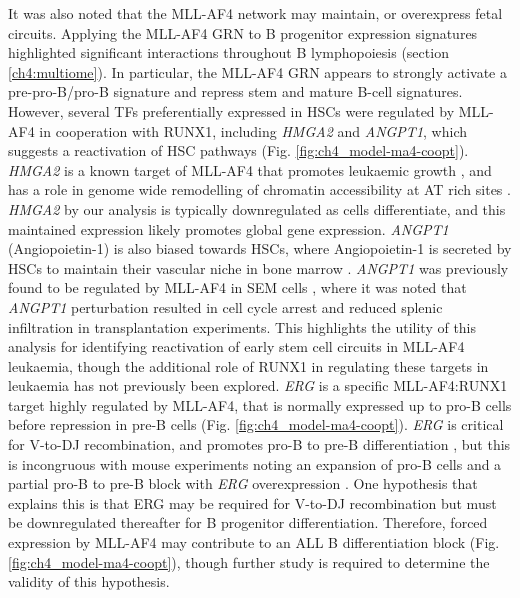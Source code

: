 It was also noted that the MLL-AF4 network may maintain, or overexpress fetal circuits. Applying the MLL-AF4 GRN to B progenitor expression signatures highlighted significant interactions throughout B lymphopoiesis (section \ref{ch4:multiome}). In particular, the MLL-AF4 GRN appears to strongly activate a pre-pro-B/pro-B signature and repress stem and mature B-cell signatures. However, several TFs preferentially expressed in HSCs were regulated by MLL-AF4 in cooperation with RUNX1, including \textit{HMGA2} and \textit{ANGPT1}, which suggests a reactivation of HSC pathways (Fig. \ref{fig:ch4_model-ma4-coopt}). \textit{HMGA2} is a known target of MLL-AF4 that promotes leukaemic growth \citep{eguchi-ishimae_hmga2_2014, guenther_aberrant_2008}, and has a role in genome wide remodelling of chromatin accessibility at AT rich sites \citep{vignali_hmga_2020}. \textit{HMGA2} by our analysis is typically downregulated as cells differentiate, and this maintained expression likely promotes global gene expression. \textit{ANGPT1} (Angiopoietin-1) is also biased towards HSCs, where Angiopoietin-1 is secreted by HSCs to maintain their vascular niche in bone marrow \citep{zhou_hematopoietic_2015}. \textit{ANGPT1} was previously found to be regulated by MLL-AF4 in SEM cells \citep{castro_angiopoietin1_2010}, where it was noted that \textit{ANGPT1} perturbation resulted in cell cycle arrest and reduced splenic infiltration in transplantation experiments. This highlights the utility of this analysis for identifying reactivation of early stem cell circuits in MLL-AF4 leukaemia, though the additional role of RUNX1 in regulating these targets in leukaemia has not previously been explored. \textit{ERG} is a specific MLL-AF4:RUNX1 target highly regulated by MLL-AF4, that is normally expressed up to pro-B cells before repression in pre-B cells (Fig. \ref{fig:ch4_model-ma4-coopt}). \textit{ERG} is critical for V-to-DJ recombination, and promotes pro-B to pre-B differentiation \citep{sondergaard_erg_2019}, but this is incongruous with mouse experiments noting an expansion of pro-B cells and a partial pro-B to pre-B block with \textit{ERG} overexpression \citep{tsuzuki_promotion_2011}. One hypothesis that explains this is that ERG may be required for V-to-DJ recombination but must be downregulated thereafter for B progenitor differentiation. Therefore, forced expression by MLL-AF4 may contribute to an ALL B differentiation block (Fig. \ref{fig:ch4_model-ma4-coopt}), though further study is required to determine the validity of this hypothesis. 

